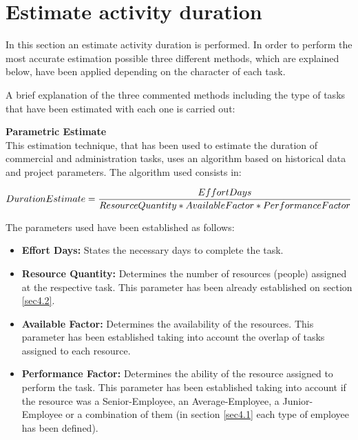 \chapter{Estimate activity duration}

In this section an estimate activity duration is performed. In order to perform the most accurate estimation possible three different methods, which are explained below, have been applied depending on the character of each task. 

A brief explanation of the three commented methods including the type of tasks that have been estimated with each one is carried out:

\textbf{Parametric Estimate} \\
This estimation technique, that has been used to estimate the duration of commercial and administration tasks, uses an algorithm based on historical data and project parameters. The algorithm used consists in: 

\begin{equation}
\centering
\notag Duration Estimate=\frac{Effort Days}{Resource Quantity * Available Factor * Performance Factor}
\end{equation}

The parameters used have been established as follows:

\begin{itemize}
	
	\item \textbf{Effort Days:} States the necessary days to complete the task.
	
	\item \textbf{Resource Quantity:} Determines the number of resources (people) assigned at the respective task. This parameter has been already established on section \ref{sec4.2}.
	
	\item \textbf{Available Factor:} Determines the availability of the resources. This parameter has been established taking into account the overlap of tasks assigned to each resource.

	\item \textbf{Performance Factor:} Determines the ability of the resource assigned to perform the task. This parameter has been established taking into account if the resource was a Senior-Employee, an Average-Employee, a Junior-Employee or a combination of them (in section \ref{sec4.1} each type of employee has been defined).
	
\end{itemize} 

